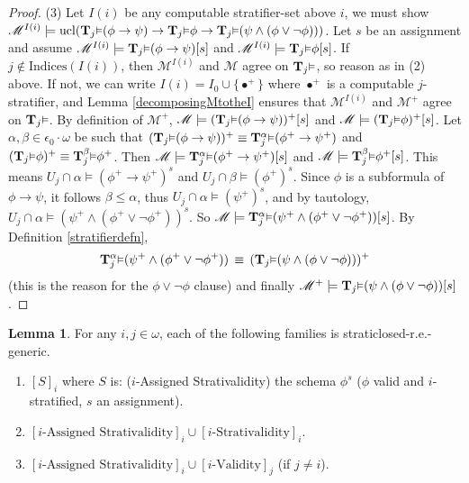 \documentclass[reqno]{article}
\theoremstyle{definition}
\newtheorem{lemma}[theorem]{Lemma}
\def\M{\mathscr{M}}
\def\T{\mathbf{T}}
\def\indices{\mathrm{Indices}}
\def\epom{\epsilon_0\cdot\omega}
\renewcommand{\Pr}[1]{\T_{#1}\mbox{\small${\vDash}$}}
\newcommand{\Prr}[2]{\T^{#1}_{#2}\mbox{\small${\vDash}$}}
\newcommand{\ucl}[1]{\mathrm{ucl}(#1)}
\begin{document}
\begin{proof}
\item
(3) Let $I(i)$ be any computable stratifier-set above $i$,
we must show
$\M^{I(i)}\models \ucl{\Pr j(\phi\rightarrow\psi)\rightarrow \Pr j\phi\rightarrow \Pr j(\psi\wedge(\phi\vee\neg\phi))}$.
Let $s$ be an assignment and assume $\M^{I(i)}\models \Pr j(\phi\rightarrow\psi)[s]$
and $\M^{I(i)}\models\Pr j\phi[s]$.
If $j\not\in\indices(I(i))$, then $\M^{I(i)}$ and $\M$
agree on $\Pr j$, so reason as in (2) above.
If not, we can write $I(i)=I_0\cup\{\bullet^+\}$ where $\bullet^+$ is a
computable $j$-stratifier, and Lemma \ref{decomposingMtotheI} ensures that
$\M^{I(i)}$ and $\M^+$ agree on $\Pr j$.
By definition of $\M^+$, $\M\models(\Pr j(\phi\rightarrow\psi))^+[s]$
and $\M\models(\Pr j\phi)^+[s]$.
Let $\alpha,\beta\in\epom$ be such that $(\Pr j(\phi\rightarrow\psi))^+\equiv\Prr\alpha j(\phi^+\rightarrow\psi^+)$
and $(\Pr j\phi)^+\equiv\Prr\beta j\phi^+$.
Then
$\M\models\Prr\alpha j (\phi^+\rightarrow\psi^+)[s]$ and $\M\models\Prr\beta j\phi^+[s]$.
This means $U_j\cap\alpha\models(\phi^+\rightarrow\psi^+)^s$ and $U_j\cap\beta\models(\phi^+)^s$.
Since $\phi$ is a subformula of $\phi\rightarrow\psi$, it follows $\beta\leq\alpha$, thus
$U_j\cap\alpha\models (\psi^+)^s$, and by tautology,
$U_j\cap\alpha\models(\psi^+\wedge(\phi^+\vee\neg\phi^+))^s$.
So $\M\models\Prr\alpha j(\psi^+\wedge(\phi^+\vee\neg\phi^+))[s]$.
By Definition \ref{stratifierdefn},
\[
\Prr\alpha j(\psi^+\wedge(\phi^+\vee\neg\phi^+)) \,\equiv\, (\Pr j(\psi\wedge(\phi\vee\neg\phi)))^+
\]
(this is the reason for the $\phi\vee\neg\phi$ clause)
and finally $\M^+\models \Pr j(\psi\wedge(\phi\vee\neg\phi))[s]$.
\end{proof}

\begin{lemma}
\label{secondutilbagvalidity}
For any $i,j\in\omega$, each of the following families is straticlosed-r.e.-generic.
\begin{enumerate}
\item $[S]_i$ where $S$ is: ($i$-Assigned Strativalidity)
the schema $\phi^s$ ($\phi$ valid and $i$-stratified, $s$ an assignment).
\item $[\mbox{$i$-Assigned Strativalidity}]_i \cup [\mbox{$i$-Strativalidity}]_i$.
\item $[\mbox{$i$-Assigned Strativalidity}]_i \cup
[\mbox{$i$-Validity}]_j$ (if $j\not=i$).
\end{enumerate}
\end{lemma}
\end{document}
